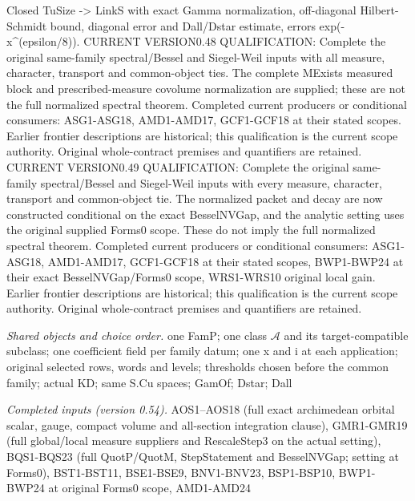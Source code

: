 Closed TuSize -> LinkS with exact Gamma normalization, off-diagonal Hilbert-Schmidt bound, diagonal error and Dall/Dstar estimate, errors exp(-x\textasciicircum{}(epsilon/8)). CURRENT VERSION0.48 QUALIFICATION: Complete the original same-family spectral/Bessel and Siegel-Weil inputs with all measure, character, transport and common-object ties. The complete MExists measured block and prescribed-measure covolume normalization are supplied; these are not the full normalized spectral theorem. Completed current producers or conditional consumers: ASG1-ASG18, AMD1-AMD17, GCF1-GCF18 at their stated scopes. Earlier frontier descriptions are historical; this qualification is the current scope authority. Original whole-contract premises and quantifiers are retained. CURRENT VERSION0.49 QUALIFICATION: Complete the original same-family spectral/Bessel and Siegel-Weil inputs with every measure, character, transport and common-object tie. The normalized packet and decay are now constructed conditional on the exact BesselNVGap, and the analytic setting uses the original supplied Forms0 scope. These do not imply the full normalized spectral theorem. Completed current producers or conditional consumers: ASG1-ASG18, AMD1-AMD17, GCF1-GCF18 at their stated scopes, BWP1-BWP24 at their exact BesselNVGap/Forms0 scope, WRS1-WRS10 original local gain. Earlier frontier descriptions are historical; this qualification is the current scope authority. Original whole-contract premises and quantifiers are retained.

\emph{Shared objects and choice order.} one FamP; one class $\mathcal A$ and its target-compatible subclass; one coefficient field per family datum; one x and i at each application; original selected rows, words and levels; thresholds chosen before the common family; actual KD; same S.Cu spaces; GamOf; Dstar; Dall

\emph{Completed inputs (version 0.54).} AOS1–AOS18 (full exact archimedean orbital scalar, gauge, compact volume and all-section integration clause), GMR1-GMR19 (full global/local measure suppliers and RescaleStep3 on the actual setting), BQS1-BQS23 (full QuotP/QuotM, StepStatement and BesselNVGap; setting at Forms0), BST1-BST11, BSE1-BSE9, BNV1-BNV23, BSP1-BSP10, BWP1-BWP24 at original Forms0 scope, AMD1-AMD24


